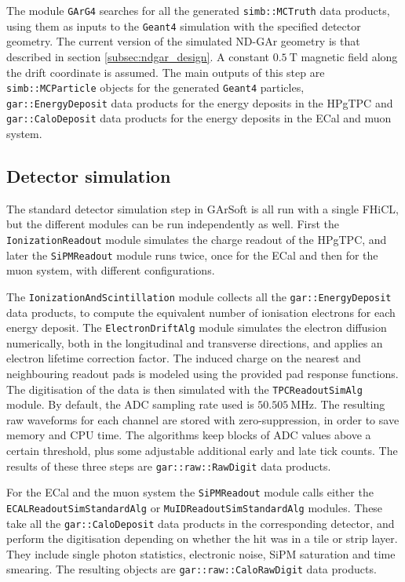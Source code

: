 The module \texttt{GArG4} searches for all the generated \texttt{simb::MCTruth} data products, using them as inputs to the \texttt{Geant4} simulation with the specified detector geometry. The current version of the simulated ND-GAr geometry is that described in section \ref{subsec:ndgar_design}. A constant $0.5~\mathrm{T}$ magnetic field along the drift coordinate is assumed. The main outputs of this step are \texttt{simb::MCParticle} objects for the generated \texttt{Geant4} particles, \texttt{gar::EnergyDeposit} data products for the energy deposits in the HPgTPC and \texttt{gar::CaloDeposit} data products for the energy deposits in the ECal and muon system.

\subsection{Detector simulation}

The standard detector simulation step in GArSoft is all run with a single FHiCL, but the different modules can be run independently as well. First the \texttt{IonizationReadout} module simulates the charge readout of the HPgTPC, and later the \texttt{SiPMReadout} module runs twice, once for the ECal and then for the muon system, with different configurations.

The \texttt{IonizationAndScintillation} module collects all the \texttt{gar::EnergyDeposit} data products, to compute the equivalent number of ionisation electrons for each energy deposit. The \texttt{ElectronDriftAlg} module simulates the electron diffusion numerically, both in the longitudinal and transverse directions, and applies an electron lifetime correction factor. The induced charge on the nearest and neighbouring readout pads is modeled using the provided pad response functions. The digitisation of the data is then simulated with the \texttt{TPCReadoutSimAlg} module. By default, the ADC sampling rate used is $50.505~\mathrm{MHz}$. The resulting raw waveforms for each channel are stored with zero-suppression, in order to save memory and CPU time. The algorithms keep blocks of ADC values above a certain threshold, plus some adjustable additional early and late tick counts. The results of these three steps are \texttt{gar::raw::RawDigit} data products.

For the ECal and the muon system the \texttt{SiPMReadout} module calls either the \texttt{ECALReadoutSimStandardAlg} or \texttt{MuIDReadoutSimStandardAlg} modules. These take all the \texttt{gar::CaloDeposit} data products in the corresponding detector, and perform the digitisation depending on whether the hit was in a tile or strip layer. They include single photon statistics, electronic noise, SiPM saturation and time smearing. The resulting objects are \texttt{gar::raw::CaloRawDigit} data products.

